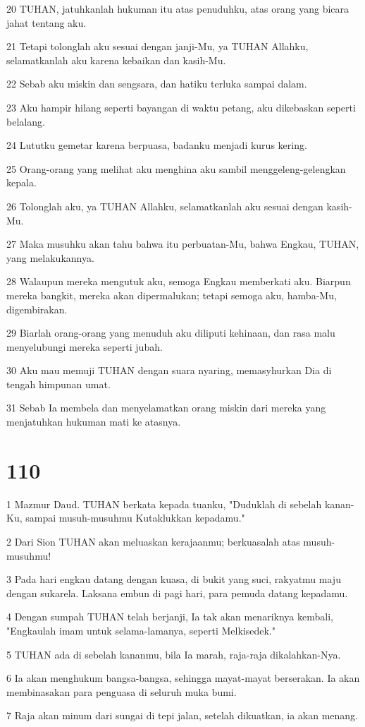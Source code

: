 \par 20 TUHAN, jatuhkanlah hukuman itu atas penuduhku, atas orang yang bicara jahat tentang aku.
\par 21 Tetapi tolonglah aku sesuai dengan janji-Mu, ya TUHAN Allahku, selamatkanlah aku karena kebaikan dan kasih-Mu.
\par 22 Sebab aku miskin dan sengsara, dan hatiku terluka sampai dalam.
\par 23 Aku hampir hilang seperti bayangan di waktu petang, aku dikebaskan seperti belalang.
\par 24 Lututku gemetar karena berpuasa, badanku menjadi kurus kering.
\par 25 Orang-orang yang melihat aku menghina aku sambil menggeleng-gelengkan kepala.
\par 26 Tolonglah aku, ya TUHAN Allahku, selamatkanlah aku sesuai dengan kasih-Mu.
\par 27 Maka musuhku akan tahu bahwa itu perbuatan-Mu, bahwa Engkau, TUHAN, yang melakukannya.
\par 28 Walaupun mereka mengutuk aku, semoga Engkau memberkati aku. Biarpun mereka bangkit, mereka akan dipermalukan; tetapi semoga aku, hamba-Mu, digembirakan.
\par 29 Biarlah orang-orang yang menuduh aku diliputi kehinaan, dan rasa malu menyelubungi mereka seperti jubah.
\par 30 Aku mau memuji TUHAN dengan suara nyaring, memasyhurkan Dia di tengah himpunan umat.
\par 31 Sebab Ia membela dan menyelamatkan orang miskin dari mereka yang menjatuhkan hukuman mati ke atasnya.

\chapter{110}

\par 1 Mazmur Daud. TUHAN berkata kepada tuanku, "Duduklah di sebelah kanan-Ku, sampai musuh-musuhmu Kutaklukkan kepadamu."
\par 2 Dari Sion TUHAN akan meluaskan kerajaanmu; berkuasalah atas musuh-musuhmu!
\par 3 Pada hari engkau datang dengan kuasa, di bukit yang suci, rakyatmu maju dengan sukarela. Laksana embun di pagi hari, para pemuda datang kepadamu.
\par 4 Dengan sumpah TUHAN telah berjanji, Ia tak akan menariknya kembali, "Engkaulah imam untuk selama-lamanya, seperti Melkisedek."
\par 5 TUHAN ada di sebelah kananmu, bila Ia marah, raja-raja dikalahkan-Nya.
\par 6 Ia akan menghukum bangsa-bangsa, sehingga mayat-mayat berserakan. Ia akan membinasakan para penguasa di seluruh muka bumi.
\par 7 Raja akan minum dari sungai di tepi jalan, setelah dikuatkan, ia akan menang.

